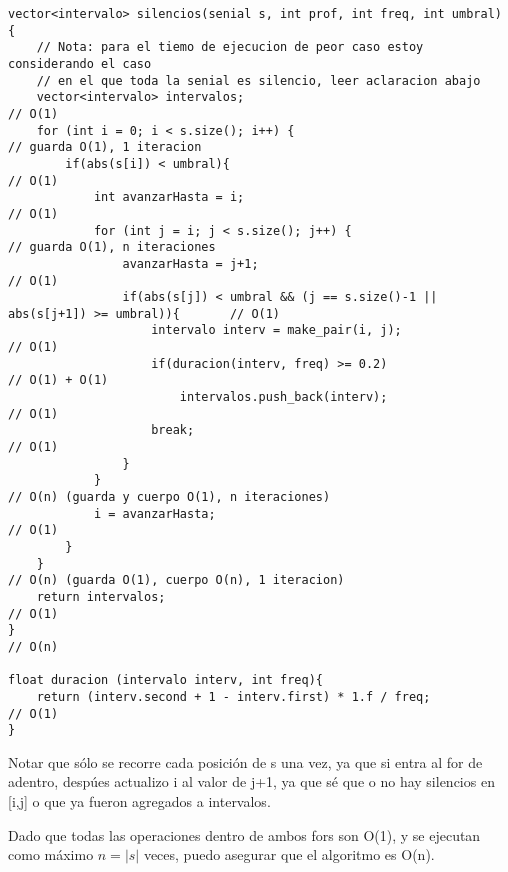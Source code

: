 \documentclass{article}
\begin{document}
\begin{lstlisting}
vector<intervalo> silencios(senial s, int prof, int freq, int umbral) {
    // Nota: para el tiemo de ejecucion de peor caso estoy considerando el caso
    // en el que toda la senial es silencio, leer aclaracion abajo
    vector<intervalo> intervalos;                                                       // O(1)
    for (int i = 0; i < s.size(); i++) {                                                // guarda O(1), 1 iteracion
        if(abs(s[i]) < umbral){                                                         // O(1)
            int avanzarHasta = i;                                                       // O(1)
            for (int j = i; j < s.size(); j++) {                                        // guarda O(1), n iteraciones
                avanzarHasta = j+1;                                                     // O(1)
                if(abs(s[j]) < umbral && (j == s.size()-1 || abs(s[j+1]) >= umbral)){       // O(1)
                    intervalo interv = make_pair(i, j);                                 // O(1)
                    if(duracion(interv, freq) >= 0.2)                                   // O(1) + O(1)
                        intervalos.push_back(interv);                                   // O(1)
                    break;                                                              // O(1)
                }
            }                                                                           // O(n) (guarda y cuerpo O(1), n iteraciones)
            i = avanzarHasta;                                                           // O(1)
        }
    }                                                                                   // O(n) (guarda O(1), cuerpo O(n), 1 iteracion)
    return intervalos;                                                                  // O(1)
}                                                                                       // O(n)

float duracion (intervalo interv, int freq){
    return (interv.second + 1 - interv.first) * 1.f / freq;                             // O(1)
}
\end{lstlisting}

Notar que sólo se recorre cada posición de s una vez, ya que si entra al for de adentro, despúes actualizo i
al valor de j+1, ya que sé que o no hay silencios en [i,j] o que ya fueron agregados a intervalos.

Dado que todas las operaciones dentro de ambos fors son O(1), y se ejecutan como máximo $n=|s|$ veces, puedo
asegurar que el algoritmo es O(n).
\end{document}
